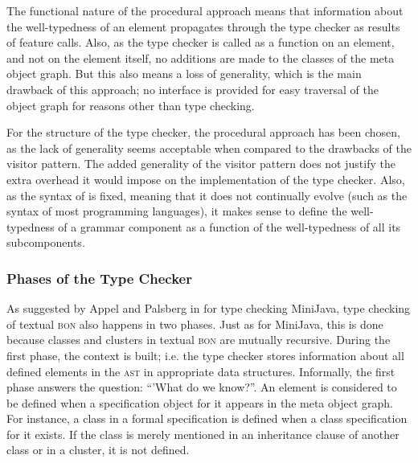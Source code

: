 The functional nature of the procedural approach means that information about the well-typedness of an element propagates through the type checker as results of feature calls. Also, as the type checker is called as a function on an element, and not on the element itself, no additions are made to the classes of the meta object graph. But this also means a loss of generality, which is the main drawback of this approach; no interface is provided for easy traversal of the object graph for reasons other than type checking.

For the structure of the type checker, the procedural approach has been chosen, as the lack of generality seems acceptable when compared to the drawbacks of the visitor pattern. The added generality of the visitor pattern does not justify the extra overhead it would impose on the implementation of the type checker. Also, as the syntax of \bon{} is fixed, meaning that it does not continually evolve (such as the syntax of most programming languages), it makes sense to define the well-typedness of a grammar component as a function of the well-typedness of all its subcomponents.

\subsubsection	{Phases of the Type Checker}
\label{design-phases}
As suggested by Appel and Palsberg in \cite[section~5.2]{appel2004} for type checking MiniJava, type checking of textual \textsc{bon} also happens in two phases. Just as for MiniJava, this is done because classes and clusters in textual \textsc{bon} are mutually recursive.
During the first phase, the context is built; i.e. the type checker stores information about all defined elements in the \textsc{ast} in appropriate data structures. Informally, the first phase answers the question: ``'What do we know?''. An element is considered to be defined when a specification object for it appears in the meta object graph. For instance, a class in a formal specification is defined when a class specification for it exists. If the class is merely mentioned in an inheritance clause of another class or in a cluster, it is not defined.

